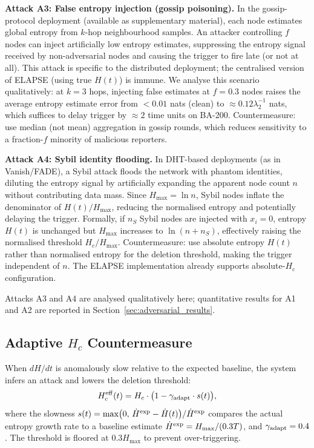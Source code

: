 \documentclass[review,12pt]{elsarticle}
\newcommand{\Hc}{H_c}
\newcommand{\Hmax}{H_{\max}}
\begin{document}
\textbf{Attack A3: False entropy injection (gossip poisoning).}
In the gossip-protocol deployment (available as supplementary material), each node
estimates global entropy from $k$-hop neighbourhood samples.
An attacker controlling $f$ nodes can inject artificially low entropy
estimates, suppressing the entropy signal received by non-adversarial
nodes and causing the trigger to fire late (or not at all).
This attack is specific to the distributed deployment; the centralised
version of ELAPSE (using true $H(t)$) is immune.
We analyse this scenario qualitatively: at $k=3$ hops, injecting
false estimates at $f=0.3$ nodes raises the average entropy estimate
error from $<0.01$ nats (clean) to $\approx 0.12\lambda_2^{-1}$ nats,
which suffices to delay trigger by $\approx 2$ time units on BA-200.
Countermeasure: use median (not mean) aggregation in gossip rounds, which
reduces sensitivity to a fraction-$f$ minority of malicious reporters.

\textbf{Attack A4: Sybil identity flooding.}
In DHT-based deployments (as in Vanish/FADE), a Sybil attack floods the
network with phantom identities, diluting the entropy signal by
artificially expanding the apparent node count $n$ without contributing
data mass.  Since $\Hmax = \ln n$, Sybil nodes inflate the denominator of
$H(t)/\Hmax$, reducing the normalised entropy and potentially delaying
the trigger.  Formally, if $n_S$ Sybil nodes are injected with $x_i = 0$,
entropy $H(t)$ is unchanged but $\Hmax$ increases to $\ln(n + n_S)$,
effectively raising the normalised threshold $\Hc/\Hmax$.
Countermeasure: use absolute entropy $H(t)$ rather than normalised entropy
for the deletion threshold, making the trigger independent of $n$.
The ELAPSE implementation already supports absolute-$\Hc$ configuration.

\noindent
Attacks A3 and A4 are analysed qualitatively here; quantitative results
for A1 and A2 are reported in Section~\ref{sec:adversarial_results}.

\subsection{Adaptive \texorpdfstring{$H_c$}{Hc} Countermeasure}

When $dH/dt$ is anomalously slow relative to the expected baseline, the
system infers an attack and lowers the deletion threshold:
\begin{equation}
  \Hc^{\rm eff}(t) = \Hc \cdot \bigl(1 - \gamma_{\rm adapt} \cdot s(t)\bigr),
  \label{eq:adaptive_hc}
\end{equation}
where the slowness $s(t) = \max\bigl(0,\, \dot{H}^{\rm exp} - \dot{H}(t)\bigr) / \dot{H}^{\rm exp}$
compares the actual entropy growth rate to a baseline estimate
$\dot{H}^{\rm exp} = \Hmax / (0.3T)$, and $\gamma_{\rm adapt} = 0.4$.
The threshold is floored at $0.3\Hmax$ to prevent over-triggering.
\end{document}
